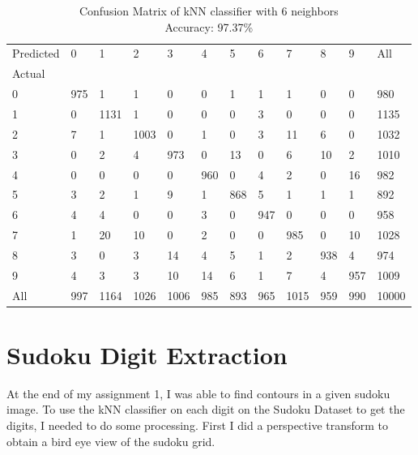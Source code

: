 \begin{table}[H]
    \centering
    \begin{tabular}{llllllllllll}
        Predicted & 0 & 1     & 2     & 3     & 4    & 5    & 6    & 7     & 8    & 9    & All    \\
        Actual &      &       &       &       &      &      &      &       &      &      &        \\
        0      &  975 &     1 &     1 &     0 &    0 &    1 &    1 &     1 &    0 &    0 &    980 \\
        1      &    0 &  1131 &     1 &     0 &    0 &    0 &    3 &     0 &    0 &    0 &   1135 \\
        2      &    7 &     1 &  1003 &     0 &    1 &    0 &    3 &    11 &    6 &    0 &   1032 \\
        3      &    0 &     2 &     4 &   973 &    0 &   13 &    0 &     6 &   10 &    2 &   1010 \\
        4      &    0 &     0 &     0 &     0 &  960 &    0 &    4 &     2 &    0 &   16 &    982 \\
        5      &    3 &     2 &     1 &     9 &    1 &  868 &    5 &     1 &    1 &    1 &    892 \\
        6      &    4 &     4 &     0 &     0 &    3 &    0 &  947 &     0 &    0 &    0 &    958 \\
        7      &    1 &    20 &    10 &     0 &    2 &    0 &    0 &   985 &    0 &   10 &   1028 \\
        8      &    3 &     0 &     3 &    14 &    4 &    5 &    1 &     2 &  938 &    4 &    974 \\
        9      &    4 &     3 &     3 &    10 &   14 &    6 &    1 &     7 &    4 &  957 &   1009 \\
        All    &  997 &  1164 &  1026 &  1006 &  985 &  893 &  965 &  1015 &  959 &  990 &  10000 \\
    \end{tabular}
    \caption*{Confusion Matrix of kNN classifier with 6 neighbors\\
    Accuracy: 97.37\%}
\end{table}


\newpage

\section*{Sudoku Digit Extraction}

At the end of my assignment 1, I was able to find contours in a given sudoku
image. To use the kNN classifier on each digit on the Sudoku Dataset to get the
digits, I needed to do some processing. First I did a perspective transform to
obtain a bird eye view of the sudoku grid. 


